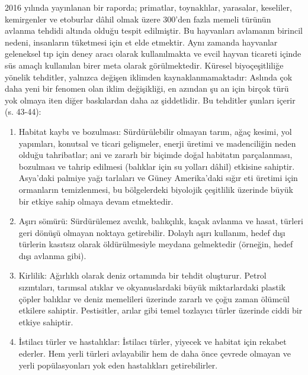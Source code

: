 \documentclass[
]{book}
\begin{document}
2016 yılında yayınlanan bir raporda; primatlar, toynaklılar, yarasalar, keseliler, kemirgenler ve etoburlar dâhil olmak üzere 300'den fazla memeli türünün avlanma tehdidi altında olduğu tespit edilmiştir. Bu hayvanları avlamanın birincil nedeni, insanların tüketmesi için et elde etmektir. Aynı zamanda hayvanlar geleneksel tıp için deney aracı olarak kullanılmakta ve evcil hayvan ticareti içinde süs amaçlı kullanılan birer meta olarak görülmektedir. Küresel biyoçeşitliliğe yönelik tehditler, yalnızca değişen iklimden kaynaklanmamaktadır: Aslında çok daha yeni bir fenomen olan iklim değişikliği, en azından şu an için birçok türü yok olmaya iten diğer baskılardan daha az şiddetlidir. Bu tehditler şunları içerir (s. 43-44): \citep{bush2020}

\begin{enumerate}
\def\labelenumi{\arabic{enumi})}
\item
  Habitat kaybı ve bozulması:
  Sürdürülebilir olmayan tarım, ağaç kesimi, yol yapımları, konutsal ve ticari gelişmeler, enerji üretimi ve madenciliğin neden olduğu tahribatlar; ani ve zararlı bir biçimde doğal habitatın parçalanması, bozulması ve tahrip edilmesi (balıklar için su yolları dâhil) etkisine sahiptir. Asya'daki palmiye yağı tarlaları ve Güney Amerika'daki sığır eti üretimi için ormanların temizlenmesi, bu bölgelerdeki biyolojik çeşitlilik üzerinde büyük bir etkiye sahip olmaya devam etmektedir.
\item
  Aşırı sömürü: Sürdürülemez avcılık, balıkçılık, kaçak avlanma ve hasat, türleri geri dönüşü olmayan noktaya getirebilir. Dolaylı aşırı kullanım, hedef dışı türlerin kasıtsız olarak öldürülmesiyle meydana gelmektedir (örneğin, hedef dışı avlanma gibi).
\item
  Kirlilik: Ağırlıklı olarak deniz ortamında bir tehdit oluşturur. Petrol sızıntıları, tarımsal atıklar ve okyanuslardaki büyük miktarlardaki plastik çöpler balıklar ve deniz memelileri üzerinde zararlı ve çoğu zaman ölümcül etkilere sahiptir. Pestisitler, arılar gibi temel tozlayıcı türler üzerinde ciddi bir etkiye sahiptir.
\item
  İstilacı türler ve hastalıklar: İstilacı türler, yiyecek ve habitat için rekabet ederler. Hem yerli türleri avlayabilir hem de daha önce çevrede olmayan ve yerli popülasyonları yok eden hastalıkları getirebilirler.
\end{enumerate}
\end{document}
